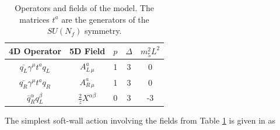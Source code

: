\begin{table}[htb]
\begin{center}
\begin{tabular}{|c|c|c|c|c|}
\hline 
4D Operator & 5D Field & $p$ & $\Delta$ & $m_{5}^{2}L^{2}$\\
\hline 
\hline 
$\bar{q_{L}}\gamma^{\mu}t^{a}q_{L}$ & $A_{L\,\mu}^{a}$ & 1 & 3 & 0\\
\hline 
$\bar{q_{R}}\gamma^{\mu}t^{a}q_{R}$ & $A_{R\,\mu}^{a}$ & 1 & 3 & 0\\
\hline 
$\bar{q}_{R}^{\alpha}q_{L}^{\beta}$ & $\frac{2}{z}X^{\alpha\beta}$ & 0 & 3 & -3\\
\hline 
\end{tabular}
\end{center}
\caption{Operators and fields of the model. The matrices $t^{a}$ are the generators of the $SU(N_{f})$ symmetry. 
\label{tab:Operators-and-fields}}
\end{table}

The simplest soft-wall action involving the fields from Table \ref{tab:Operators-and-fields}
is given in \cite{karch-katz-son-adsqcd} as 

